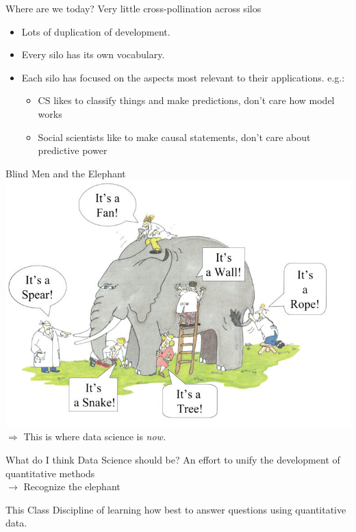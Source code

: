 \documentclass[11pt]{beamer}
\begin{document}
\begin{frame}[c]{Where are we today?}
Very little cross-pollination across silos
\begin{itemize}
    \pause \item Lots of duplication of development.
    \pause \item Every silo has its own vocabulary.
    \pause \item Each silo has focused on the aspects most relevant to their applications. e.g.:
    \begin{itemize}
        \pause \item CS likes to classify things and make predictions, don't care how model works
        \item Social scientists like to make causal statements, don't care about predictive power
    \end{itemize}
\end{itemize}
\end{frame}

\begin{frame}[c]{Blind Men and the Elephant}
\pause \includegraphics[width=\textwidth]{blindmenelephant.jpg}
\pause $\Rightarrow$ This is where data science is \emph{now.}
\end{frame}

\begin{frame}[c]{What do I think Data Science should be?}
\pause An effort to unify the development of quantitative methods \\
\pause $\rightarrow$ Recognize the elephant
\end{frame}

\begin{frame}[c]{This Class}
Discipline of learning how best to \alert{answer questions} using \alert{quantitative data.}
\end{frame}
\end{document}
